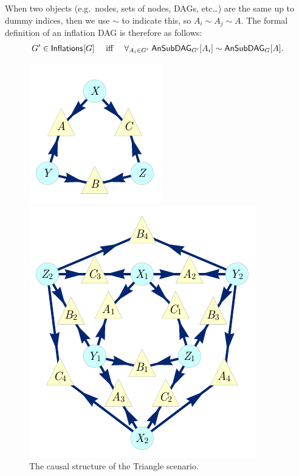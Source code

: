 When two objects (e.g.~nodes, sets of nodes, DAGs, etc\ldots) are the same up to dummy indices, then we use $\sim$ to indicate this, so $A_i\sim A_j\sim A$. 
The formal definition of an inflation DAG is therefore as follows:
\begin{align}\label{eq:definflationDAG}
G'\in\SmallNamedFunction{Inflations}{G} \quad\text{ iff }\quad \forall_{A_i\in G'}\; \ansubgraph[G']{A_i}\sim\ansubgraph[G]{A}.
\end{align}


\begin{figure}[t]
\centering
\begin{minipage}[b]{0.23\linewidth}
\centering
\includegraphics[scale=1]{TriDagRaw.pdf}
\caption{The causal structure of the Triangle scenario.}\label{fig:TriMainDAG}
\end{minipage}
\hfill
\begin{minipage}[t]{0.38\linewidth}
\centering
\includegraphics[scale=1]{TriDagFull222.pdf}

\end{minipage}
\end{figure}
